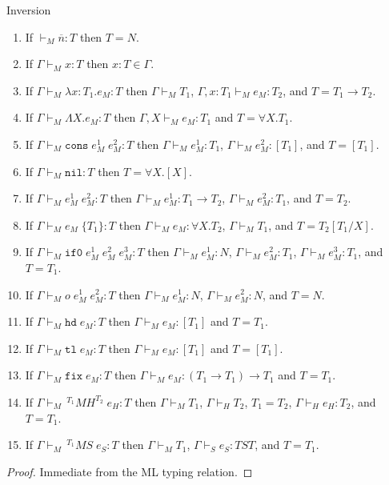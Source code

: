 \begin{mi}
\label{mi}
Inversion
\begin{enumerate}
\item If $\vdash_{M}\overline{n}:T$ then $T=N$.
\item If $\Gamma\vdash_{M}x:T$ then $x:T\in\Gamma$.
\item If $\Gamma\vdash_{M}\lambda x:T_{1}.e_{M}:T$ then $\Gamma\vdash_{M}T_{1}$, $\Gamma,x:T_{1}\vdash_{M}e_{M}:T_{2}$, and $T=T_{1}\rightarrow T_{2}$.
\item If $\Gamma\vdash_{M}\Lambda X.e_{M}:T$ then $\Gamma,X\vdash_{M}e_{M}:T_{1}$ and $T=\forall X.T_{1}$.
\item If $\Gamma\vdash_{M}\mathtt{cons}\;e_{M}^{1}\;e_{M}^{2}:T$ then $\Gamma\vdash_{M}e_{M}^{1}:T_{1}$, $\Gamma\vdash_{M}e_{M}^{2}:[T_{1}]$, and $T=[T_{1}]$.
\item If $\Gamma\vdash_{M}\mathtt{nil}:T$ then $T=\forall X.[X]$.
\item If $\Gamma\vdash_{M}e_{M}^{1}\;e_{M}^{2}:T$ then $\Gamma\vdash_{M}e_{M}^{1}:T_{1}\rightarrow T_{2}$, $\Gamma\vdash_{M}e_{M}^{2}:T_{1}$, and $T=T_{2}$.
\item If $\Gamma\vdash_{M}e_{M}\;\lbrace T_{1}\rbrace:T$ then $\Gamma\vdash_{M}e_{M}:\forall X.T_{2}$, $\Gamma\vdash_{M}T_{1}$, and $T=T_{2}[T_{1}/X]$.
\item If $\Gamma\vdash_{M}\mathtt{if0}\;e_{M}^{1}\;e_{M}^{2}\;e_{M}^{3}:T$ then $\Gamma\vdash_{M}e_{M}^{1}:N$, $\Gamma\vdash_{M}e_{M}^{2}:T_{1}$, $\Gamma\vdash_{M}e_{M}^{3}:T_{1}$, and $T=T_{1}$.
\item If $\Gamma\vdash_{M}o\;e_{M}^{1}\;e_{M}^{2}:T$ then $\Gamma\vdash_{M}e_{M}^{1}:N$, $\Gamma\vdash_{M}e_{M}^{2}:N$, and $T=N$.
\item If $\Gamma\vdash_{M}\mathtt{hd}\;e_{M}:T$ then $\Gamma\vdash_{M}e_{M}:[T_{1}]$ and $T=T_{1}$.
\item If $\Gamma\vdash_{M}\mathtt{tl}\;e_{M}:T$ then $\Gamma\vdash_{M}e_{M}:[T_{1}]$ and $T=[T_{1}]$.
\item If $\Gamma\vdash_{M}\mathtt{fix}\;e_{M}:T$ then $\Gamma\vdash_{M}e_{M}:(T_{1}\rightarrow T_{1})\rightarrow T_{1}$ and $T=T_{1}$.
\item If $\Gamma\vdash_{M}\,^{T_{1}}MH^{T_{2}}\;e_{H}:T$ then $\Gamma\vdash_{M}T_{1}$, $\Gamma\vdash_{H}T_{2}$, $T_{1}=T_{2}$, $\Gamma\vdash_{H}e_{H}:T_{2}$, and $T=T_{1}$.
\item If $\Gamma\vdash_{M}\,^{T_{1}}MS\;e_{S}:T$ then $\Gamma\vdash_{M}T_{1}$, $\Gamma\vdash_{S}e_{S}:TST$, and $T=T_{1}$.
\end{enumerate}
\begin{proof}
Immediate from the ML typing relation.
\end{proof}
\end{mi}